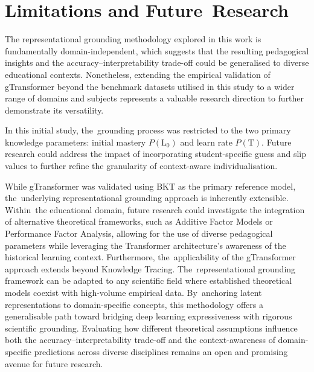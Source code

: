 \documentclass[applsci,article,accept,moreauthors,pdftex]{Definitions/mdpi}
\begin{document}

\section{Limitations and Future~Research} \label{sec_limitations_future}


{The representational grounding methodology explored in this work is fundamentally domain-independent, which suggests that the resulting pedagogical insights and the accuracy--interpretability trade-off could be generalised to diverse educational contexts.} {Nonetheless, extending the empirical validation of gTransformer beyond the benchmark datasets utilised in this study to a wider range of domains and subjects represents a valuable research direction to further demonstrate its versatility.}

{In this initial study, the~grounding process was restricted to the two primary knowledge parameters: initial mastery $P(\text{L}_0)$ and learn rate $P(\text{T})$.} {Future research could address the impact of incorporating student-specific guess and slip values to further refine the granularity of context-aware individualisation.}

{While gTransformer was validated using BKT as the primary reference model, the~underlying representational grounding approach is inherently extensible. Within~the educational domain, future research could investigate the integration of alternative theoretical frameworks, such as Additive Factor Models or Performance Factor Analysis, allowing for the use of diverse pedagogical parameters while leveraging the Transformer architecture's awareness of the historical learning context. Furthermore, the~applicability of the gTransformer approach extends beyond Knowledge Tracing. The~representational grounding framework can be adapted to any scientific field where established theoretical models coexist with high-volume empirical data. By~anchoring latent representations to domain-specific concepts, this methodology offers a {generalisable} path toward bridging deep learning expressiveness with rigorous scientific grounding. Evaluating how different theoretical assumptions influence both the accuracy--interpretability trade-off and the context-awareness of domain-specific predictions across diverse disciplines remains an open and promising avenue for future research.}
\end{document}
